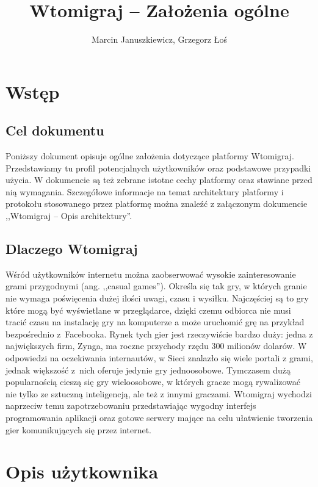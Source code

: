 \documentclass[a4paper, 12pt]{article}
\author{Marcin Januszkiewicz, Grzegorz Łoś}
\title{\textbf{Wtomigraj} -- Założenia ogólne}
\begin{document}

\break

\setcounter{page}{2}

\tableofcontents

\break

\section{Wstęp}

\subsection{Cel dokumentu}
Poniższy dokument opisuje ogólne założenia dotyczące platformy Wtomigraj. Przedstawiamy tu profil potencjalnych użytkowników oraz podstawowe przypadki użycia. W dokumencie są też zebrane istotne cechy platformy oraz stawiane przed nią wymagania. Szczegółowe informacje na temat architektury platformy i protokołu stosowanego przez platformę można znaleźć z załączonym dokumencie ,,Wtomigraj -- Opis architektury''.

\subsection{Dlaczego Wtomigraj}
Wśród użytkowników internetu można zaobserwować wysokie zainteresowanie grami przygodnymi (ang. ,,casual games''). Określa się tak gry, w których granie nie wymaga poświęcenia dużej ilości uwagi, czasu i wysiłku. Najczęściej są to gry które mogą być wyświetlane w przeglądarce, dzięki czemu odbiorca nie musi tracić czasu na instalację gry na komputerze a może uruchomić grę na przykład bezpośrednio z~Facebooka. Rynek tych gier jest rzeczywiście bardzo duży: jedna z największych firm, Zynga, ma roczne przychody rzędu 300 milionów dolarów. W odpowiedzi na oczekiwania internautów, w Sieci znalazło się wiele portali z grami, jednak większość z~nich oferuje jedynie gry jednoosobowe. Tymczasem dużą popularnością cieszą się gry wieloosobowe, w których gracze mogą rywalizować nie tylko ze sztuczną inteligencją, ale też z innymi graczami. Wtomigraj wychodzi naprzeciw temu zapotrzebowaniu przedstawiając wygodny interfejs programowania aplikacji oraz gotowe serwery mające na celu ułatwienie tworzenia gier komunikujących się przez internet.

\section[Opis użytkownika]{Opis użytkownika}
\end{document}
